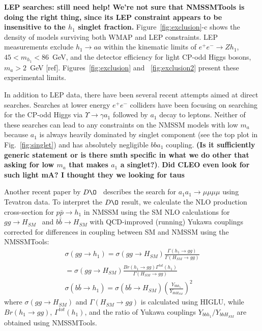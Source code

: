 \documentclass[aps,prl,twocolumn,nofootinbib,superscriptaddress]{revtex4}
\begin{document}
{\bf LEP searches: still need help!  We're not sure that NMSSMTools is
  doing the right thing, since its LEP constraint appears to be
  insensitive to the $h_1$ singlet fraction.}
Figure~\ref{fig:exclusion}-c shows the density of models surviving both WMAP and LEP constraints.
 LEP measurements exclude $h_1 \to aa$ within the kinematic
limits of $e^+e^- \to Z h_1$, $45 < m_{h_1} < 86$~GeV, and the
detector efficiency for light CP-odd Higgs bosons, $m_a > 2$~GeV
[ref].  Figures~\ref{fig:exclusion} and ~\ref{fig:exclusion2} present
these experimental limits.

In addition to LEP data, there have been several recent attempts aimed at direct searches. 
Searches at lower energy $e^+e^-$ colliders have been focusing on searching for the CP-odd Higgs 
via $\Upsilon \to \gamma a_1$ followed by $a_1$ decay to leptons. Neither of these searches can 
lead to any constraints on the NMSSM models with low $m_a$ because $a_1$ is always heavily dominated 
by singlet component (see the top plot in Fig.~\ref{fig:singlet}) and has absolutely negligible 
$bba_1$ coupling. {\bf (Is it sufficiently generic statement or is there smth specific in what we 
do other that asking for low $m_a$ that makes $a_1$ a singlet?)}. 
{\bf Did CLEO even look for such light mA? I thought they we looking for taus}

Another recent paper by $D\O$~\cite{d0-low-ma} describes the search for $a_1 a_1 \to \mu \mu \mu \mu$
using Tevatron data. To interpret the $D\O$ result, we calculate the NLO production cross-section for
$p \bar{p} \to h_1$ in NMSSM using the SM NLO calculations for $gg \to H_{SM}$~\cite{Spira:1995rr} and $b\bar{b} \to H_{SM}$
with QCD-improved (running) Yukawa couplings~\cite{Balazs:1998sb} corrected for differences in coupling between SM 
and NMSSM using the NMSSMTools:
\begin{eqnarray}
\sigma(gg\to h_1)=\sigma(gg\to H_{SM})\frac{\Gamma(h_1\to gg)}{\Gamma(H_{SM}\to gg)} \\ \nonumber
=\sigma(gg\to H_{SM})\frac{Br(h_1\to gg)\Gamma^{tot}(h_1)}{\Gamma(H_{SM}\to gg)} \\
\sigma(b\bar{b}\to h_1)=\sigma(b\bar{b}\to H_{SM})
\left(\frac{Y_{bbh_1}}{Y_{bbH_{SM}}}\right)^2
\end{eqnarray}
where $\sigma(gg\to H_{SM})$ and $\Gamma(H_{SM}\to gg)$ is calculated using
HIGLU, while $Br(h_1\to gg)$, $\Gamma^{tot}(h_1)$, and the ratio of Yukawa couplings 
$Y_{bbh_1}/Y_{bbH_{SM}}$ are obtained using NMSSMTools.
\end{document}
